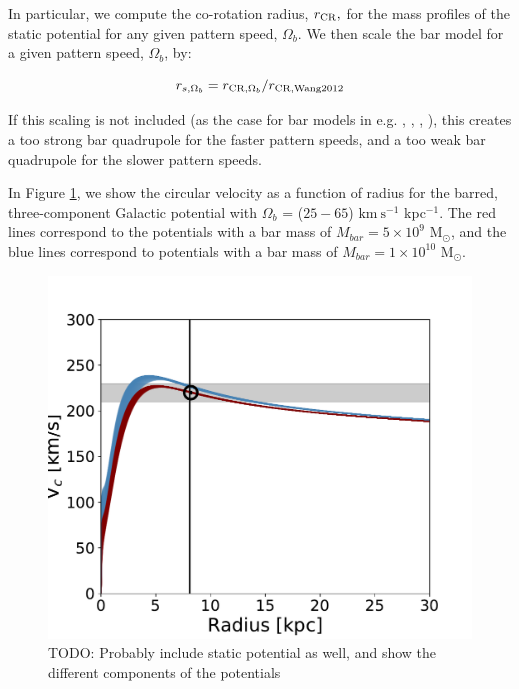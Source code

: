\documentclass[modern]{aastex62}
\newcommand{\msun}{\textrm{M}_\odot}
\newcommand{\kms}{\ensuremath{\textrm{km}~\textrm{s}^{-1}}}
\newcommand{\todo}[1]{{\color{red} TODO: #1}}
\begin{document}
In particular, we  compute the co-rotation radius, $r_{\rm CR},$ for the mass profiles of the static potential for any given pattern speed, $\Omega_b$. We then scale the bar model for a given pattern speed, $\Omega_b$, by:

\begin{equation} 
r_{s, \Omega_b}  = r_{{\rm CR}, \Omega_b}/r_{{\rm CR, Wang 2012}}
\end{equation} 

If this scaling is not included (as the case for bar models in e.g. \citealt{price:2016b}, \citealt{Pearson:2017}, \citealt{Erkal:2017}, \citealt{Banik:2019}), this creates a too strong bar quadrupole for the faster pattern speeds, and a too weak bar quadrupole for the slower pattern speeds. 

In Figure \ref{fig:vcirc}, we show the circular velocity as a function of radius for the barred, three-component Galactic potential with $\Omega_b$ = ($25 - 65$) $\kms$ kpc$^{-1}$. The red lines correspond to the potentials with a bar mass of $M_{bar} = 5 \times 10^{9}$ $\msun$, and the blue lines correspond to potentials with a bar mass of  $M_{bar} = 1 \times 10^{10}$ $\msun$.

\begin{figure}
\centerline{\includegraphics[width=\columnwidth]{v_circ_nlm919.pdf}}
\caption{\todo{Probably include static potential as well, and show the different components of the potentials }}
\label{fig:vcirc}
\end{figure}
\end{document}
